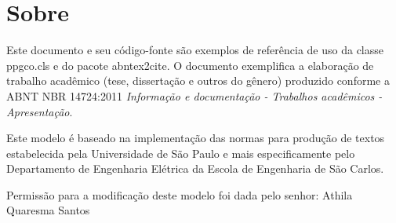 \chapter[Sobre]{Sobre}

Este documento e seu código-fonte são exemplos de referência de uso da classe
\textsf{ppgco.cls} e do pacote \textsf{abntex2cite}. O documento 
exemplifica a elaboração de trabalho acadêmico (tese, dissertação e outros do
gênero) produzido conforme a \ac{ABNT} \ac{NBR} 14724:2011 \emph{Informação e documentação
- Trabalhos acadêmicos - Apresentação}.

Este modelo é baseado na implementação das normas  para produção de textos estabelecida pela Universidade de São Paulo e mais especificamente pelo Departamento de Engenharia Elétrica da Escola de Engenharia de São Carlos.

Permissão para a modificação deste modelo foi dada pelo senhor: Athila Quaresma Santos